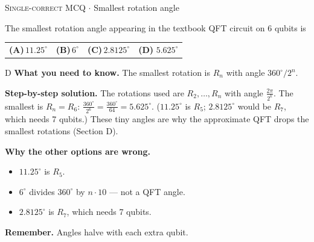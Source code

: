 \documentclass[11pt,a4paper]{article}
\newcommand{\optlabel}[1]{\textbf{(#1)}}
\newcommand{\correctlabel}[1]{\textcolor{okgreen}{\textbf{(#1)}\,\ding{51}}}
\newenvironment{qitem}[1]{\begin{list}{}{\setlength{\leftmargin}{3.3em}\setlength{\labelwidth}{3.1em}%
  \setlength{\labelsep}{0.2em}\setlength{\topsep}{3pt}\setlength{\parsep}{3pt}}\item[\textbf{Q.#1}\hfill]}{\end{list}}
\newcommand{\qsep}{\par\vspace{2pt}{\color{black!15}\hrule}\vspace{4pt}}
\newcommand{\qmeta}[2]{{\footnotesize\color{black!60}\textsc{#1} \;$\cdot$\; #2}\par}
\begin{document}
\begin{qitem}{46}
\qmeta{Single-correct MCQ}{Smallest rotation angle}
The smallest rotation angle appearing in the textbook QFT circuit on $6$ qubits is
\par\smallskip\noindent\begin{tabularx}{\linewidth}{@{}*{4}{L}@{}}
\optlabel{A}\,$11.25^\circ$ & \optlabel{B}\,$6^\circ$ & \optlabel{C}\,$2.8125^\circ$ & \correctlabel{D}\,$5.625^\circ$
\end{tabularx}
\end{qitem}
\begin{solbox}{D}
\textbf{\color{brand}What you need to know.} The smallest rotation is $R_n$ with angle $360^\circ/2^n$.

\textbf{\color{brand}Step-by-step solution.} The rotations used are $R_2, \dots, R_n$ with angle $\frac{2\pi}{2^k}$. The smallest is $R_n = R_6$:
$\frac{360^\circ}{2^6} = \frac{360^\circ}{64} = 5.625^\circ$. ($11.25^\circ$ is $R_5$; $2.8125^\circ$ would be $R_7$, which needs 7 qubits.)
These tiny angles are why the approximate QFT drops the smallest rotations (Section D).

\textbf{\color{brand}Why the other options are wrong.}
\begin{itemize}[leftmargin=2.4em, itemsep=1pt, topsep=2pt]
\item[\textbf{(A)}] $11.25^\circ$ is $R_5$.
\item[\textbf{(B)}] $6^\circ$ divides $360^\circ$ by $n\cdot10$ --- not a QFT angle.
\item[\textbf{(C)}] $2.8125^\circ$ is $R_7$, which needs 7 qubits.
\end{itemize}
\textbf{\color{brand}Remember.} Angles halve with each extra qubit.
\end{solbox}
\qsep
\end{document}
